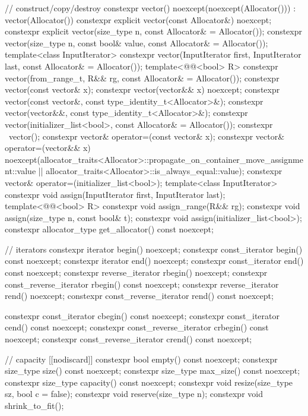 \begin{codeblock}
{{    // construct/copy/destroy
    constexpr vector() noexcept(noexcept(Allocator())) : vector(Allocator()) { }
    constexpr explicit vector(const Allocator&) noexcept;
    constexpr explicit vector(size_type n, const Allocator& = Allocator());
    constexpr vector(size_type n, const bool& value, const Allocator& = Allocator());
    template<class InputIterator>
      constexpr vector(InputIterator first, InputIterator last, const Allocator& = Allocator());
    template<@@<bool> R>
      constexpr vector(from_range_t, R&& rg, const Allocator& = Allocator());
    constexpr vector(const vector& x);
    constexpr vector(vector&& x) noexcept;
    constexpr vector(const vector&, const type_identity_t<Allocator>&);
    constexpr vector(vector&&, const type_identity_t<Allocator>&);
    constexpr vector(initializer_list<bool>, const Allocator& = Allocator());
    constexpr ~vector();
    constexpr vector& operator=(const vector& x);
    constexpr vector& operator=(vector&& x)
      noexcept(allocator_traits<Allocator>::propagate_on_container_move_assignment::value ||
               allocator_traits<Allocator>::is_always_equal::value);
    constexpr vector& operator=(initializer_list<bool>);
    template<class InputIterator>
      constexpr void assign(InputIterator first, InputIterator last);
    template<@@<bool> R>
      constexpr void assign_range(R&& rg);
    constexpr void assign(size_type n, const bool& t);
    constexpr void assign(initializer_list<bool>);
    constexpr allocator_type get_allocator() const noexcept;

    // iterators
    constexpr iterator               begin() noexcept;
    constexpr const_iterator         begin() const noexcept;
    constexpr iterator               end() noexcept;
    constexpr const_iterator         end() const noexcept;
    constexpr reverse_iterator       rbegin() noexcept;
    constexpr const_reverse_iterator rbegin() const noexcept;
    constexpr reverse_iterator       rend() noexcept;
    constexpr const_reverse_iterator rend() const noexcept;

    constexpr const_iterator         cbegin() const noexcept;
    constexpr const_iterator         cend() const noexcept;
    constexpr const_reverse_iterator crbegin() const noexcept;
    constexpr const_reverse_iterator crend() const noexcept;

    // capacity
    [[nodiscard]] constexpr bool empty() const noexcept;
    constexpr size_type size() const noexcept;
    constexpr size_type max_size() const noexcept;
    constexpr size_type capacity() const noexcept;
    constexpr void      resize(size_type sz, bool c = false);
    constexpr void      reserve(size_type n);
    constexpr void      shrink_to_fit();

}}
\end{codeblock}
